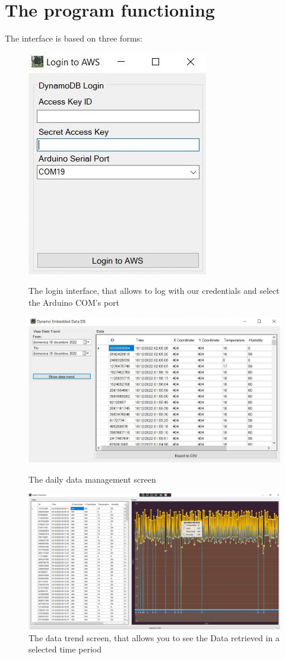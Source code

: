 \documentclass[]{article}
\begin{document}
	\section{The program functioning}
	The interface is based on three forms:
		\begin{figure}[h!]
		  \centering
		  \includegraphics[width=0.25\columnwidth]{Login.JPG}
		  \label{fig1}
		  \caption*{The login interface, that allows to log with our credentials and select the Arduino COM's port}
	\end{figure}
	\begin{figure}[h!]
			\centering
			\includegraphics[width=0.5\columnwidth]{Management.JPG}
			\label{fig2}
			\caption*{The daily data management screen}
	\end{figure}
	\begin{figure}[h!]
			\centering
			\includegraphics[width=0.5\columnwidth]{Archive.png}
			\caption*{The data trend screen, that allows you to see the Data retrieved in a selected time period}
			\label{fig3}
	\end{figure}
	\pagebreak
\end{document}
